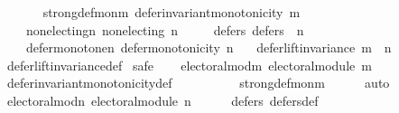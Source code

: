 \begin{isabellebody}
\ \ \isanewline
\ \ \ \ strong{\isacharunderscore}{\kern0pt}def{\isacharunderscore}{\kern0pt}mon{\isacharunderscore}{\kern0pt}m{\isacharcolon}{\kern0pt}\ {\isachardoublequoteopen}defer{\isacharunderscore}{\kern0pt}invariant{\isacharunderscore}{\kern0pt}monotonicity\ m{\isachardoublequoteclose}\ \isanewline
\ \ \ \ non{\isacharunderscore}{\kern0pt}electing{\isacharunderscore}{\kern0pt}n{\isacharcolon}{\kern0pt}\ {\isachardoublequoteopen}non{\isacharunderscore}{\kern0pt}electing\ n{\isachardoublequoteclose}\ \isanewline
\ \ \ \ defers{\isacharunderscore}{\kern0pt}{}{\isacharcolon}{\kern0pt}\ {\isachardoublequoteopen}defers\ {}\ n{\isachardoublequoteclose}\ \isanewline
\ \ \ \ defer{\isacharunderscore}{\kern0pt}monotone{\isacharunderscore}{\kern0pt}n{\isacharcolon}{\kern0pt}\ {\isachardoublequoteopen}defer{\isacharunderscore}{\kern0pt}monotonicity\ n{\isachardoublequoteclose}\isanewline
\ \ \ {\isachardoublequoteopen}defer{\isacharunderscore}{\kern0pt}lift{\isacharunderscore}{\kern0pt}invariance\ {\isacharparenleft}{\kern0pt}m\ {\isasymtriangleright}\ n{\isacharparenright}{\kern0pt}{\isachardoublequoteclose}\isanewline
%
\isadelimproof
\ \ %
\endisadelimproof
%
\isatagproof
{}\isamarkupfalse%
\ defer{\isacharunderscore}{\kern0pt}lift{\isacharunderscore}{\kern0pt}invariance{\isacharunderscore}{\kern0pt}def\isanewline
{}\isamarkupfalse%
\ {\isacharparenleft}{\kern0pt}safe{\isacharparenright}{\kern0pt}\isanewline
\ \ \isamarkupfalse%
\ electoral{\isacharunderscore}{\kern0pt}mod{\isacharunderscore}{\kern0pt}m{\isacharcolon}{\kern0pt}\ {\isachardoublequoteopen}electoral{\isacharunderscore}{\kern0pt}module\ m{\isachardoublequoteclose}\isanewline
\ \ \ \ \isamarkupfalse%
\ defer{\isacharunderscore}{\kern0pt}invariant{\isacharunderscore}{\kern0pt}monotonicity{\isacharunderscore}{\kern0pt}def\isanewline
\ \ \ \ \ \ \ \ \ \ strong{\isacharunderscore}{\kern0pt}def{\isacharunderscore}{\kern0pt}mon{\isacharunderscore}{\kern0pt}m\isanewline
\ \ \ \ \isamarkupfalse%
\ auto\isanewline
\ \ \isamarkupfalse%
\ electoral{\isacharunderscore}{\kern0pt}mod{\isacharunderscore}{\kern0pt}n{\isacharcolon}{\kern0pt}\ {\isachardoublequoteopen}electoral{\isacharunderscore}{\kern0pt}module\ n{\isachardoublequoteclose}\isanewline
\ \ \ \ \isamarkupfalse%
\ defers{\isacharunderscore}{\kern0pt}{}\ defers{\isacharunderscore}{\kern0pt}def\isanewline
\ \ \ \ \isamarkupfalse%

\end{isabellebody}
